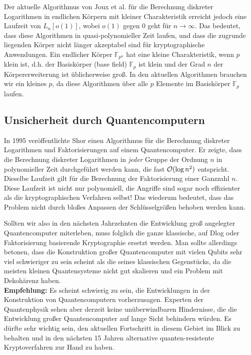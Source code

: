 \begin{refsegment}
Der aktuelle Algorithmus von Joux et al. für die Berechnung diskreter Logarithmen in endlichen Körpern mit kleiner Charakteristik erreicht jedoch eine Laufzeit von $L_n[o(1)]$, wobei $o(1)$ gegen $0$ geht für $n \to \infty$. Das bedeutet, dass diese Algorithmen in quasi-polynomieller Zeit laufen, und dass die zugrunde liegenden Körper nicht länger akzeptabel sind für kryptographische Anwendungen. Ein endlicher Körper $\mathbb{F}_{p^n}$ hat eine kleine Charakteristik, wenn $p$ klein ist, d.h. der Basiskörper (base field) $\mathbb{F}_p$ ist klein und der Grad $n$ der Körpererweiterung ist üblicherweise groß. In den aktuellen Algorithmen brauchen wir ein kleines $p$, da diese Algorithmen über alle $p$ Elemente im Basiskörper $\mathbb{F}_p$ laufen.


\subsection{Unsicherheit durch Quantencomputern}
In 1995 veröffentlichte Shor einen Algorithmus für die Berechnung diskreter Logarithmen und Faktorisierungen auf einem Quantencomputer. Er zeigte, dass die Berechnung diskreter Logarithmen in {\em jeder} Gruppe der Ordnung $n$ in polynomieller Zeit durchgeführt werden kann, die fast ${\cal O}(\log n^2)$ entspricht. Dieselbe Laufzeit gilt für die Berechnung der Faktorisierung einer Ganzzahl $n$. Diese Laufzeit ist nicht nur polynomiell, die Angriffe sind sogar noch effizienter als die kryptographischen Verfahren selbst! Das wiederum bedeutet, dass das Problem nicht durch bloßes Anpassen der Schlüsselgrößen behoben werden kann.

Sollten wir also in den nächsten Jahrzehnten die Entwicklung groß angelegter Quantencomputer miterleben, muss folglich die ganze klassische, auf Dlog oder Faktorisierung basierende Kryptographie ersetzt werden. Man sollte allerdings betonen, dass die Konstruktion großer Quantencomputer mit vielen Qubits sehr viel schwieriger zu sein scheint als die seines klassischen Gegenstücks, da die meisten kleinen Quantensysteme nicht gut skalieren und ein Problem mit Dekohärenz haben.\\[0.1cm]

\noindent \textbf{Empfehlung:} Es scheint schwierig zu sein, die Entwicklungen in der Konstruktion von Quantencomputern vorherzusagen. Experten der Quantenphysik sehen aber derzeit keine unüberwindbaren Hindernisse, die die Entwicklung großer Quantencomputer auf lange Sicht behindern würden. Es dürfte sehr wichtig sein, den aktuellen Fortschritt in diesem Gebiet im Blick zu behalten und in den nächsten 15 Jahren alternative quanten-resistente Kryptoverfahren zur Hand zu haben.\\[0.1cm]


\end{refsegment}
